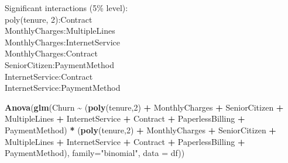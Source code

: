 \documentclass[
]{article}
\newenvironment{Shaded}{\begin{snugshade}}{\end{snugshade}}
\newcommand{\AttributeTok}[1]{\textcolor[rgb]{0.13,0.29,0.53}{#1}}
\newcommand{\DecValTok}[1]{\textcolor[rgb]{0.00,0.00,0.81}{#1}}
\newcommand{\FunctionTok}[1]{\textcolor[rgb]{0.13,0.29,0.53}{\textbf{#1}}}
\newcommand{\NormalTok}[1]{#1}
\newcommand{\SpecialCharTok}[1]{\textcolor[rgb]{0.81,0.36,0.00}{\textbf{#1}}}
\newcommand{\StringTok}[1]{\textcolor[rgb]{0.31,0.60,0.02}{#1}}
\begin{document}
Significant interactions (5\% level):\\
poly(tenure, 2):Contract\\
MonthlyCharges:MultipleLines\\
MonthlyCharges:InternetService\\
MonthlyCharges:Contract\\
SeniorCitizen:PaymentMethod\\
InternetService:Contract\\
InternetService:PaymentMethod

\begin{Shaded}
\begin{Highlighting}[]
\FunctionTok{Anova}\NormalTok{(}\FunctionTok{glm}\NormalTok{(Churn }\SpecialCharTok{\textasciitilde{}}\NormalTok{ (}\FunctionTok{poly}\NormalTok{(tenure,}\DecValTok{2}\NormalTok{) }\SpecialCharTok{+}\NormalTok{ MonthlyCharges }\SpecialCharTok{+}\NormalTok{ SeniorCitizen }\SpecialCharTok{+}\NormalTok{ MultipleLines }\SpecialCharTok{+}\NormalTok{ InternetService }\SpecialCharTok{+}\NormalTok{ Contract }\SpecialCharTok{+}\NormalTok{ PaperlessBilling }\SpecialCharTok{+}\NormalTok{ PaymentMethod) }\SpecialCharTok{*}\NormalTok{ (}\FunctionTok{poly}\NormalTok{(tenure,}\DecValTok{2}\NormalTok{) }\SpecialCharTok{+}\NormalTok{ MonthlyCharges }\SpecialCharTok{+}\NormalTok{ SeniorCitizen }\SpecialCharTok{+}\NormalTok{ MultipleLines }\SpecialCharTok{+}\NormalTok{ InternetService }\SpecialCharTok{+}\NormalTok{ Contract }\SpecialCharTok{+}\NormalTok{ PaperlessBilling }\SpecialCharTok{+}\NormalTok{ PaymentMethod), }\AttributeTok{family=}\StringTok{"binomial"}\NormalTok{, }\AttributeTok{data =}\NormalTok{ df))}
\end{Highlighting}
\end{Shaded}
\end{document}
